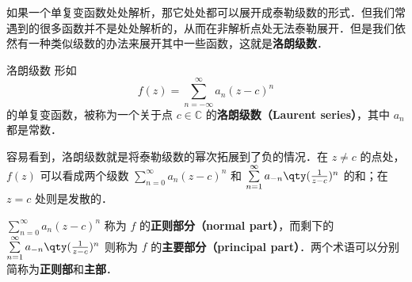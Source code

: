 

如果一个单复变函数处处解析，那它处处都可以展开成泰勒级数的形式．但我们常遇到的很多函数并不是处处解析的，从而在非解析点处无法泰勒展开．但是我们依然有一种类似级数的办法来展开其中一些函数，这就是\textbf{洛朗级数}．

\begin{definition}{洛朗级数}
形如
\begin{equation}
f(z)=\sum\limits_{n=-\infty}^{\infty} a_n(z-c)^n
\end{equation}
的单复变函数，被称为一个关于点 $c\in\mathbb{C}$ 的\textbf{洛朗级数（Laurent series）}，其中 $a_n$ 都是常数．


\end{definition}

容易看到，洛朗级数就是将泰勒级数的幂次拓展到了负的情况．在 $z\neq c$ 的点处，$f(z)$ 可以看成两个级数 $\sum\limits_{n=0}^{\infty} a_n(z-c)^n$ 和 $\sum\limits_{n=1}^{\infty} a_{-n}\qty(\frac{1}{z-c})^n$ 的和；在 $z=c$ 处则是发散的．

$\sum\limits_{n=0}^{\infty} a_n(z-c)^n$ 称为 $f$ 的\textbf{正则部分（normal part）}，而剩下的 $\sum\limits_{n=1}^{\infty} a_{-n}\qty(\frac{1}{z-c})^n$ 则称为 $f$ 的\textbf{主要部分（principal part）}．两个术语可以分别简称为\textbf{正则部}和\textbf{主部}．



















